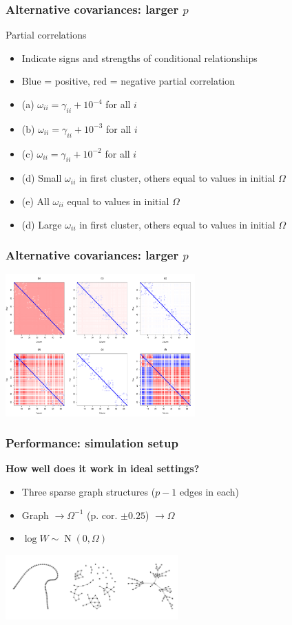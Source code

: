 \documentclass{beamer}
\newcommand{\N}{\operatorname{N}}
\begin{document}
\begin{frame}
\frametitle{Alternative covariances: larger $p$}
Partial correlations
\begin{itemize}
\item Indicate signs and strengths of conditional relationships
\item {\color{blue} Blue} = positive, {\color{red} red} = negative partial correlation
\pause
\item (a) $\omega_{ii} = \gamma_{ii} + 10^{-4}$ for all $i$
\item (b) $\omega_{ii} = \gamma_{ii} + 10^{-3}$ for all $i$
\item (c) $\omega_{ii} = \gamma_{ii} + 10^{-2}$ for all $i$
\item (d) Small $\omega_{ii}$ in first cluster, others equal to values in initial $\Omega$
\item (e) All $\omega_{ii}$ equal to values in initial $\Omega$
\item (d) Large $\omega_{ii}$ in first cluster, others equal to values in initial $\Omega$
\end{itemize}
\end{frame}

\begin{frame}
\frametitle{Alternative covariances: larger $p$}
\begin{center}
\includegraphics[width=275px]{figs/pcor.pdf}
\end{center}
\end{frame}

\begin{frame}
\frametitle{Performance: simulation setup}
\textbf{How well does it work in ideal settings?}

\begin{itemize}
\item Three sparse graph structures ($p-1$ edges in each)
\item Graph $\rightarrow \Omega^{-1}$ (p. cor. $\pm 0.25$) $\rightarrow \Omega$
\item $\log W \sim \N(0, \Omega)$
\end{itemize}
\begin{center}
\includegraphics[width=250px]{figs/graphs-64.pdf}
\end{center}
\end{frame}
\end{document}
